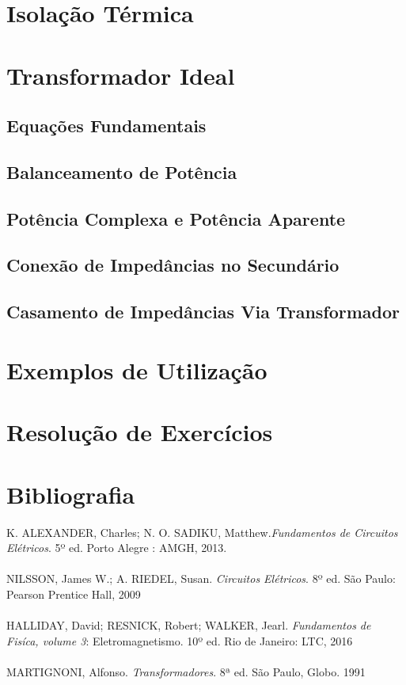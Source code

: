 \documentclass[a4paper, 12pt]{article}
\begin{document}
\section{Isolação Térmica}
\newpage
\section{Transformador Ideal}
    \subsection{Equações Fundamentais}
    \subsection{Balanceamento de Potência}
    \subsection{Potência Complexa e Potência Aparente}
    \subsection{Conexão de Impedâncias no Secundário}
    \subsection{Casamento de Impedâncias Via Transformador} \label{impedCas}
\newpage
\section{Exemplos de Utilização}
\newpage
\section{Resolução de Exercícios}
\newpage

\section*{Bibliografia}
\footnotesize{

\noindent 
K. ALEXANDER, Charles; N. O. SADIKU, Matthew.\textit{Fundamentos de Circuitos Elétricos}. 5º ed. Porto Alegre : AMGH, 2013.\\
\\
NILSSON, James W.; A. RIEDEL, Susan. \textit{Circuitos Elétricos}. 8º ed. São Paulo: Pearson Prentice Hall, 2009\\
\\
HALLIDAY, David; RESNICK, Robert; WALKER, Jearl. \textit{Fundamentos de Fisíca, volume 3}: Eletromagnetismo. 10º ed. Rio de Janeiro: LTC, 2016\\ 
\\
MARTIGNONI, Alfonso. \textit{Transformadores}. 8ª ed. São Paulo, Globo. 1991
}
\end{document}
